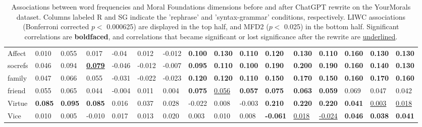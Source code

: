 \begin{table*}[ht]
{\begin{tabular}{l l l l|l l l|l l l|l l l|l l l}
Affect & 0.010 & 0.055 & 0.017 & -0.04 & 0.012 & -0.012 & \textbf{0.100} & \textbf{0.130} & \textbf{0.110} & \textbf{0.120} & \textbf{0.130} & \textbf{0.110} & \textbf{0.160} & \textbf{0.130} & \textbf{0.130} \\
socrefs & 0.046 & 0.094 & \underline{\textbf{0.079}} & -0.046 & -0.012 & -0.007 & \textbf{0.095} & \textbf{0.110} & \textbf{0.100} & \textbf{0.190} & \textbf{0.200} & \textbf{0.190} & \textbf{0.160} & \textbf{0.140} & \textbf{0.130} \\
family & 0.047 & 0.066 & 0.055 & -0.031 & -0.022 & -0.023 & \textbf{0.120} & \textbf{0.120} & \textbf{0.110} & \textbf{0.150} & \textbf{0.170} & \textbf{0.150} & \textbf{0.160} & \textbf{0.170} & \textbf{0.160} \\
friend & 0.055 & 0.065 & 0.044 & -0.004 & 0.011 & 0.004 & \textbf{0.075} & \underline{0.056} & \textbf{0.057} & \textbf{0.075} & \textbf{0.063} & \textbf{0.059} & 0.069 & 0.047 & 0.042 \\
\midrule
Virtue & \textbf{0.085} & \textbf{0.095} & \textbf{0.085} & 0.016 & 0.037 & 0.028 & -0.022 & 0.008 & -0.003 & \textbf{0.210} & \textbf{0.220} & \textbf{0.220} & \textbf{0.041} & \underline{0.003} & \underline{0.018} \\
Vice & 0.010 & 0.005 & -0.010 & 0.017 & 0.013 & 0.020 & 0.003 & 0.010 & 0.008 & \textbf{-0.061} & \underline{0.018} & \underline{-0.024} & \textbf{0.046} & \textbf{0.038} & \textbf{0.041} \\
\hline
\end{tabular}
}
\caption{Associations between word frequencies and Moral Foundations dimensions before and after ChatGPT rewrite on the YourMorals dataset. Columns labeled R and SG indicate the 'rephrase' and 'syntax-grammar' conditions, respectively. LIWC associations (Bonferroni corrected $p<$ 0.000625) are displayed in the top half, and MFD2 ($p<$ 0.025) in the bottom half. Significant correlations are \textbf{boldfaced}, and correlations that became significant or lost significance after the rewrite are \underline{underlined}.}
\label{tab:correlation_moralvalues}
\end{table*}